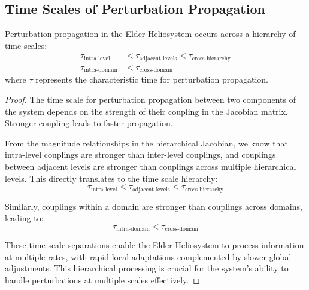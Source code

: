 \subsection{Time Scales of Perturbation Propagation}

\begin{theorem}
Perturbation propagation in the Elder Heliosystem occurs across a hierarchy of time scales:
\begin{align}
\tau_{\text{intra-level}} &< \tau_{\text{adjacent-levels}} < \tau_{\text{cross-hierarchy}} \\
\tau_{\text{intra-domain}} &< \tau_{\text{cross-domain}}
\end{align}
where $\tau$ represents the characteristic time for perturbation propagation.
\end{theorem}

\begin{proof}
The time scale for perturbation propagation between two components of the system depends on the strength of their coupling in the Jacobian matrix. Stronger coupling leads to faster propagation.

From the magnitude relationships in the hierarchical Jacobian, we know that intra-level couplings are stronger than inter-level couplings, and couplings between adjacent levels are stronger than couplings across multiple hierarchical levels. This directly translates to the time scale hierarchy:
\begin{equation}
\tau_{\text{intra-level}} < \tau_{\text{adjacent-levels}} < \tau_{\text{cross-hierarchy}}
\end{equation}

Similarly, couplings within a domain are stronger than couplings across domains, leading to:
\begin{equation}
\tau_{\text{intra-domain}} < \tau_{\text{cross-domain}}
\end{equation}

These time scale separations enable the Elder Heliosystem to process information at multiple rates, with rapid local adaptations complemented by slower global adjustments. This hierarchical processing is crucial for the system's ability to handle perturbations at multiple scales effectively.
\end{proof}

